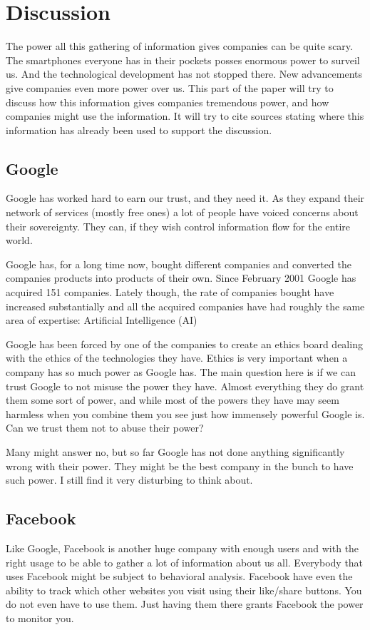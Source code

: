 \section{Discussion}
The power all this gathering of information gives companies can be quite scary. The smartphones everyone has in their pockets posses enormous power to surveil us. And the technological development has not stopped there. New advancements give companies even more power over us. This part of the paper will try to discuss how this information gives companies tremendous power, and how companies might use the information. It will try to cite sources stating where this information has already been used to support the discussion.

\subsection{Google}
Google has worked hard to earn our trust, and they need it. As they expand their network of services (mostly free ones) a lot of people have voiced concerns about their sovereignty. They can, if they wish control information flow for the entire world.

Google has, for a long time now, bought different companies and converted the companies products into products of their own. Since February 2001 Google has acquired 151 companies. Lately though, the rate of companies bought have increased substantially and all the acquired companies have had roughly the same area of expertise: Artificial Intelligence (AI)\cite{website:google-buys}

Google has been forced by one of the companies to create an ethics board dealing with the ethics of the technologies they have.\cite{website:google-ethics} Ethics is very important when a company has so much power as Google has. The main question here is if we can trust Google to not misuse the power they have. Almost everything they do grant them some sort of power, and while most of the powers they have may seem harmless when you combine them you see just how immensely powerful Google is. Can we trust them not to abuse their power?

Many might answer no, but so far Google has not done anything significantly wrong with their power. They might be the best company in the bunch to have such power. I still find it very disturbing to think about.

\subsection{Facebook}
Like Google, Facebook is another huge company with enough users and with the right usage to be able to gather a lot of information about us all. Everybody that uses Facebook might be subject to behavioral analysis. Facebook have even the ability to track which other websites you visit using their like/share buttons. You do not even have to use them. Just having them there grants Facebook the power to monitor you.\cite{website:facebook-tracking}

